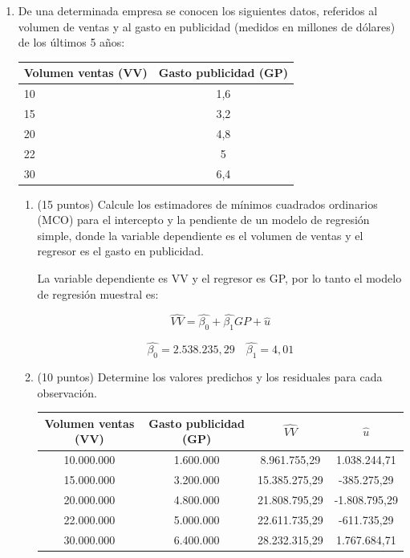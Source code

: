 \documentclass[10pt,a4paper]{article}
\begin{document}
\begin{enumerate}
$${\color{red}(\bar{X}-\bar{Y}) \pm z_{\frac{\alpha}{2}}\sqrt{\frac{\sigma_x^2}{n_x}+\frac{\sigma_y^2}{n_y}}}$$

{\color{red} [0,18; 0,42]}

{\color{red} Dado que 0 no esta en el intervalo de confianza que se construyó en a), el peso de los bebes difiere con 95\% de confianza. }


\item De una determinada empresa se conocen los siguientes datos, referidos al volumen de ventas  y al gasto en publicidad (medidos en millones de dólares) de los últimos 5 años: 


\begin{center}
    \begin{tabular}{| l| c | }
\hline
Volumen ventas (VV) &  Gasto publicidad (GP)\\ \hline
10 &1,6  \\
15 & 3,2\\ 
20 &4,8  \\
22 &5  \\
30 &6,4  \\\hline
\end{tabular}
\end{center}

\begin{enumerate}
  \item (15 puntos) Calcule los estimadores de mínimos cuadrados ordinarios (MCO) para el intercepto y la pendiente de un modelo de regresión simple, donde la variable dependiente es el volumen de ventas y el regresor es el gasto en publicidad. 

{\color{red}La variable dependiente es VV y el regresor es GP, por lo tanto el modelo de regresión muestral es:


$$\hat{VV}=\hat{\beta_0}+\hat{\beta_1}GP+\hat{u}$$

$$\hat{\beta_0}=2.538.235,29
 \quad \hat{\beta_1}=4,01$$}

  
 
  \item  (10 puntos) Determine los valores predichos y los residuales para cada observación. 

{\color{red}
\begin{center}
    \begin{tabular}{| c| c | c|c| }
\hline
Volumen ventas (VV) &  Gasto publicidad (GP)& $\hat{VV}$& $\hat{u}$  \\ \hline
10.000.000 &1.600.000 & 8.961.755,29 & 1.038.244,71\\
15.000.000 & 3.200.000 & 15.385.275,29 & -385.275,29 \\ 
20.000.000 &4.800.000 &  21.808.795,29& -1.808.795,29 \\
22.000.000 &5.000.000 &  22.611.735,29&  -611.735,29 \\
30.000.000 &6.400.000 & 28.232.315,29 & 1.767.684,71 \\\hline
\end{tabular}
\end{center}}


\end{enumerate}
\end{enumerate}
\end{document}
